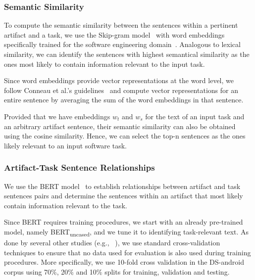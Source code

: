 

\subsubsection{Semantic Similarity}
\label{cp5:skip-gram}





To compute the semantic similarity between the sentences within a pertinent artifact and a task,
we use the Skip-gram model~\cite{Mikolov2013} with word embeddings specifically trained for the software engineering domain~\cite{Efstathiou2018}.
Analogous to lexical similarity,  we can identify the sentences with highest semantical similarity 
as the ones most likely to contain information relevant to the input task.



Since word embeddings provide vector representations at the word level, we follow Conneau et al.'s guidelines~\cite{conneau2018} 
and compute vector representations for an entire sentence by averaging the sum of the word embeddings in that sentence.


Provided that we have embeddings $w_t$ and $w_s$ for the text 
of an input task and an arbitrary artifact sentence, 
their semantic similarity can also be obtained 
using the cosine similarity. Hence, we can select the top-n sentences as the ones likely relevant to an input software task.




\subsubsection{Artifact-Task Sentence Relationships}
\label{cp5:bert}


We use the BERT model~\cite{Devlin2018Bert} to establish relationships between artifact and task sentences pairs and determine 
the sentences within an artifact that most likely contain information relevant to the task.


Since BERT requires training procedures, we start with an already pre-trained model, namely BERT\textsubscript{uncased}, and we tune it to  identifying task-relevant text.
As done by several other studies (e.g., ~\cite{Chaparro2017, fucci2019, Petrosyan2015}), we use standard cross-validation techniques to ensure  that no data used for evaluation is also used
during training procedures. More specifically, we use 10-fold cross validation in the \acs{DS-android} corpus 
using 70\%, 20\% and 10\% splits for training, validation and testing. 


